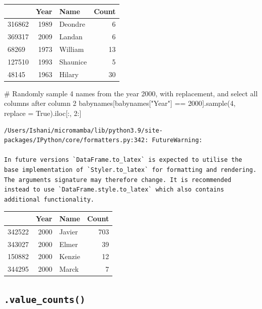 \documentclass[
  letterpaper,
  DIV=11,
  numbers=noendperiod]{scrreprt}
\newenvironment{Shaded}{\begin{snugshade}}{\end{snugshade}}
\newcommand{\CommentTok}[1]{\textcolor[rgb]{0.37,0.37,0.37}{#1}}
\newcommand{\DecValTok}[1]{\textcolor[rgb]{0.68,0.00,0.00}{#1}}
\newcommand{\NormalTok}[1]{\textcolor[rgb]{0.00,0.23,0.31}{#1}}
\newcommand{\OperatorTok}[1]{\textcolor[rgb]{0.37,0.37,0.37}{#1}}
\newcommand{\StringTok}[1]{\textcolor[rgb]{0.13,0.47,0.30}{#1}}
\newcommand{\VariableTok}[1]{\textcolor[rgb]{0.07,0.07,0.07}{#1}}
\begin{document}
\begin{tabular}{lrlr}
\toprule
{} &  Year &      Name &  Count \\
\midrule
316862 &  1989 &   Deondre &      6 \\
369317 &  2009 &    Landan &      6 \\
68269  &  1973 &   William &     13 \\
127510 &  1993 &  Shaunice &      5 \\
48145  &  1963 &    Hilary &     30 \\
\bottomrule
\end{tabular}

\begin{Shaded}
\begin{Highlighting}[]
\CommentTok{\# Randomly sample 4 names from the year 2000, with replacement, and select all columns after column 2}
\NormalTok{babynames[babynames[}\StringTok{"Year"}\NormalTok{] }\OperatorTok{==} \DecValTok{2000}\NormalTok{].sample(}\DecValTok{4}\NormalTok{, replace }\OperatorTok{=} \VariableTok{True}\NormalTok{).iloc[:, }\DecValTok{2}\NormalTok{:]}
\end{Highlighting}
\end{Shaded}

\begin{verbatim}
/Users/Ishani/micromamba/lib/python3.9/site-packages/IPython/core/formatters.py:342: FutureWarning:

In future versions `DataFrame.to_latex` is expected to utilise the base implementation of `Styler.to_latex` for formatting and rendering. The arguments signature may therefore change. It is recommended instead to use `DataFrame.style.to_latex` which also contains additional functionality.
\end{verbatim}

\begin{tabular}{lrlr}
\toprule
{} &  Year &    Name &  Count \\
\midrule
342522 &  2000 &  Javier &    703 \\
343027 &  2000 &   Elmer &     39 \\
150882 &  2000 &  Kenzie &     12 \\
344295 &  2000 &   Marck &      7 \\
\bottomrule
\end{tabular}

\hypertarget{value_counts}{%
\subsection{\texorpdfstring{\texttt{.value\_counts()}}{.value\_counts()}}\label{value_counts}}
\end{document}
